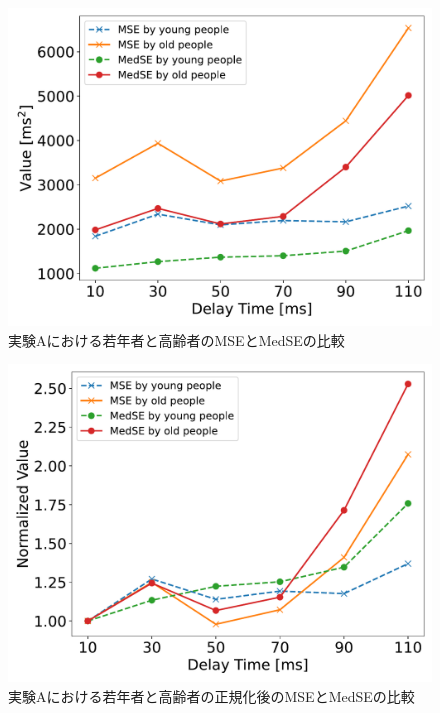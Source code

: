 \begin{figure}[tbp]
  \centering
  \includegraphics[scale=0.5]{figures/Honbann/Comparison_young_old/110_MSE-MedSE.pdf}
  \caption{実験Aにおける若年者と高齢者のMSEとMedSEの比較}
  \label{fig:110ms_MSE_MedSE}
\end{figure}
\begin{figure}[tbp]
  \centering
  \includegraphics[scale=0.5]{figures/Honbann/Comparison_young_old/110_MSE-MedSE_normalized.pdf}
  \caption{実験Aにおける若年者と高齢者の正規化後のMSEとMedSEの比較}
  \label{fig:Normalized_110ms_MSE_MedSE}
\end{figure}
